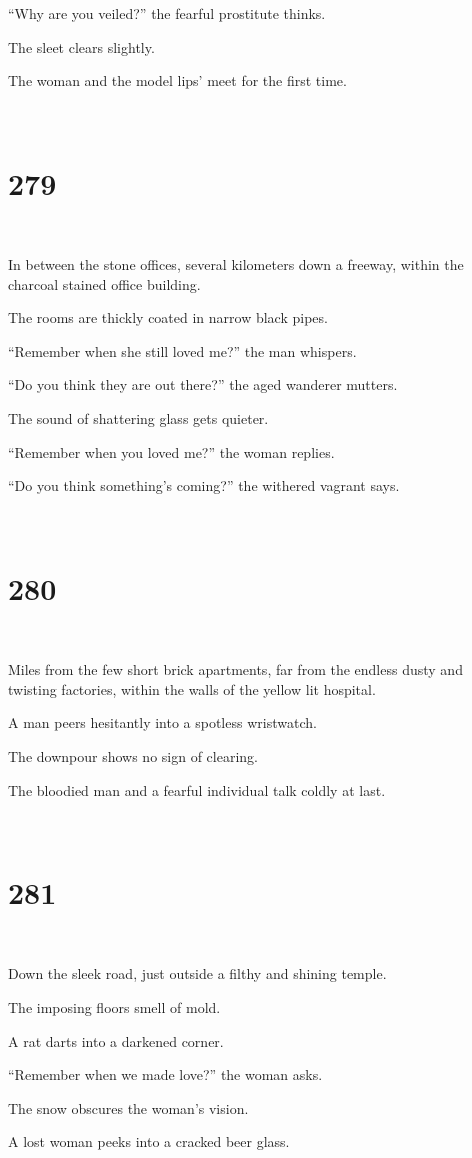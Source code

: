 \documentclass{report}
\begin{document}
``Why are you veiled?'' the fearful prostitute thinks.

The sleet clears slightly.

The woman and the model lips' meet for the first time.

~
\chapter*{279}
~

In between the stone offices, several kilometers down a freeway, within the charcoal stained office building.

The rooms are thickly coated in narrow black pipes.

``Remember when she still loved me?'' the man whispers.

``Do you think they are out there?'' the aged wanderer mutters.

The sound of shattering glass gets quieter.

``Remember when you loved me?'' the woman replies.

``Do you think something's coming?'' the withered vagrant says.

~
\chapter*{280}
~

Miles from the few short brick apartments, far from the endless dusty and twisting factories, within the walls of the yellow lit hospital.

A man peers hesitantly into a spotless wristwatch.

The downpour shows no sign of clearing.

The bloodied man and a fearful individual talk coldly at last.

~
\chapter*{281}
~

Down the sleek road, just outside a filthy and shining temple.

The imposing floors smell of mold.

A rat darts into a darkened corner.

``Remember when we made love?'' the woman asks.

The snow obscures the woman's vision.

A lost woman peeks into a cracked beer glass.
\end{document}
